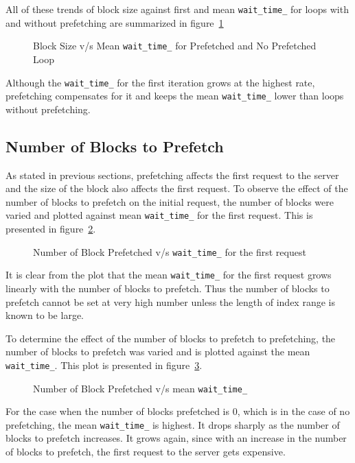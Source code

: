 All of these trends of block size against first and mean \texttt{wait\_time\_} for
loops with and without prefetching are summarized in figure~\ref{fig:block_size_avg_all}
\begin{figure}[h]
  
  \caption{Block Size v/s Mean \texttt{wait\_time\_} for Prefetched and No Prefetched Loop}
  \label{fig:block_size_avg_all}
\end{figure}

Although the \texttt{wait\_time\_} for the first iteration grows at the highest rate,
prefetching compensates for it and keeps the mean \texttt{wait\_time\_} lower than
loops without prefetching.

\subsection{Number of Blocks to Prefetch}
As stated in previous sections, prefetching affects the first request to the server
and the size of the block also affects the first request. To observe the effect of
the number of blocks to prefetch on the initial request, the number of blocks were
varied and plotted against mean \texttt{wait\_time\_} for the first request. This is
presented in figure~\ref{fig:look_ahead_first_wait_time}.
\begin{figure}[h]
  
  \caption{Number of Block Prefetched v/s \texttt{wait\_time\_} for the first request}
  \label{fig:look_ahead_first_wait_time}
\end{figure}

It is clear from the plot that the mean \texttt{wait\_time\_} for the first request
grows linearly with the number of blocks to prefetch. Thus the number of blocks
to prefetch cannot be set at very high number unless the length of index range is
known to be large.

To determine the effect of the number of blocks to prefetch to prefetching, the number
of blocks to prefetch was varied and is plotted against the mean \texttt{wait\_time\_}.
This plot is presented in figure~\ref{fig:look_ahead_avg_wait_time}.
\begin{figure}[h]
  
  \caption{Number of Block Prefetched v/s mean \texttt{wait\_time\_}}
  \label{fig:look_ahead_avg_wait_time}
\end{figure}

For the case when the number of blocks prefetched is 0, which is in the case of no
prefetching, the mean \texttt{wait\_time\_} is highest. It drops sharply as the
number of blocks to prefetch increases. It grows again, since with an increase
in the number of blocks to prefetch, the first request to the server gets expensive.


